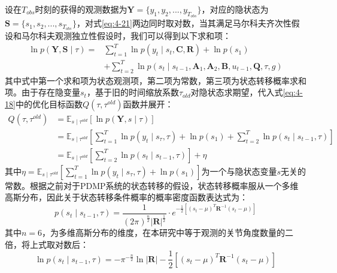 设在$T_{obs}$时刻的获得的观测数据为$\mathbf{Y}=\{y_1,y_2,...,y_{T_{obs}}\}$，对应的隐状态为$\mathbf S = \{s_1,s_2,...,s_{T_{obs}}\}$，对式\ref{eq:4-21}两边同时取对数，当其满足马尔科夫齐次性假设和马尔科夫观测独立性假设时，我们可以得到以下求和项：
\begin{equation}
    \begin{aligned}
    \ln p(\mathbf{Y}, \mathbf{S} \mid \tau)= & \sum_{t=1}^T \ln p\left(y_t \mid s_t, \mathbf{C}, \mathbf{R}\right)+\ln p\left(s_1\right) \\
    & +\sum_{t=2}^T \ln p\left(s_t \mid s_{t-1}, \mathbf{A}_1, \mathbf{A}_2, \mathbf{B}, u_{t-1}, \mathbf{Q}, \tau, g\right)
    \end{aligned}
    \label{eq:4-20}
\end{equation}
其中式中第一个求和项为状态观测项，第二项为常数，第三项为状态转移概率求和项。由于存在隐变量$s_t$，基于旧的时间缩放系数$\tau_{old}$对隐状态求期望，代入式\ref{eq:4-18}中的优化目标函数$ Q\left(\tau, \tau^{old}\right)$函数并展开：
\begin{equation}
\begin{aligned}
    Q\left(\tau, \tau^{old}\right)
    &=\mathbb{E}_{s \mid \tau^{old}}\left[\ln p(\mathbf{Y}, s \mid \tau)\right]\\
    & =\mathbb{E}_{s \mid \tau^{old}}\left[\sum_{t=1}^T \ln p\left(y_t \mid s_\tau, \tau\right)+\ln p\left(s_1\right)+\sum_{t=2}^T \ln p\left(s_t \mid s_{t-1}, \tau\right)\right] \\
    & =\mathbb{E}_{s \mid \tau^{old}}\left[\sum_{t=2}^T \ln p\left(s_t \mid s_{t-1}, \tau\right)\right] + \eta 
\end{aligned}
\label{eq:4-21}
\end{equation}
其中$\eta=\mathbb{E}_{s \mid \tau^{old}} \left[\sum_{t=1}^T \ln p\left(y_t \mid s_\tau, \tau\right) + \ln p\left(s_1\right)\right]$为一个与隐状态变量$s$无关的常数。根据之前对于PDMP系统的状态转移的假设，状态转移概率服从一个多维高斯分布，因此关于状态转移条件概率的概率密度函数表达式为：
\begin{equation}
    p\left(s_t \mid s_{t-1}, \tau\right)=\frac{1}{(2 \pi)^{\frac{n}{2}}|\mathbf{R}|^{\frac{1}{2}}} \cdot e^{-\frac{1}{2}\left[\left(s_t-\mu\right)^T \mathbf{R}^{-1}\left(s_t-\mu\right)\right]}
    \label{eq:4-22}
\end{equation}
其中$n=6$，为多维高斯分布的维度，在本研究中等于观测的关节角度数量的二倍，将上式取对数后：
\begin{equation}
    \ln p\left(s_t \mid s_{t-1}, \tau\right)=-\pi^{-\frac{n}{2}}\ln\mathbf{|R|}-\frac{1}{2}\left[\left(s_t-\mu\right)^T \mathbf{R}^{-1}\left(s_t-\mu\right)\right]
    \label{eq:4-23}
\end{equation}
